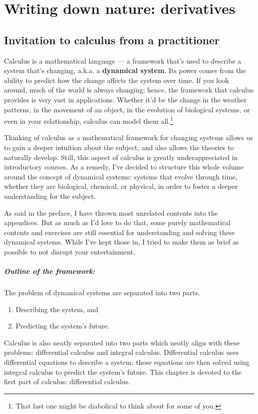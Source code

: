 \chapter{Writing down nature: derivatives}
\label{sec:derivatives}


\section{Invitation to calculus from a practitioner}

Calculus is a mathematical language --- a framework that's used to describe a system that's changing, a.k.a. a \textbf{dynamical system}. Its power comes from the ability to predict how the change affects the system over time. If you look around, much of the world is always changing; hence, the framework that calculus provides is very vast in applications. Whether it'd be the change in the weather patterns, in the movement of an object, in the evolution of biological systems, or even in your relationship, calculus can model them all.\footnote{That last one might be diabolical to think about for some of you.}

Thinking of calculus as a mathematical framework for changing systems allows us to gain a deeper intuition about the subject, and also allows the theories to naturally develop. Still, this aspect of calculus is greatly underappreciated in introductory courses. As a remedy, I've decided to structure this whole volume around the concept of dynamical systems: systems that evolve through time, whether they are biological, chemical, or physical, in order to foster a deeper understanding for the subject.

As said in the preface, I have thrown most unrelated contents into the appendices. But as much as I'd love to do that, some purely mathematical contents and exercises are still essential for understanding and solving these dynamical systems. While I've kept those in, I tried to make them as brief as possible to not disrupt your entertainment.

\paragraph{Outline of the framework:} The problem of dynamical systems are separated into two parts.
\begin{enumerate}[noitemsep]
  \item Describing the system, and
  \item Predicting the system's future.
\end{enumerate}
Calculus is also neatly separated into two parts which neatly align with these problems: differential calculus and integral calculus. Differential calculus uses differential equations to describe a system; those equations are then solved using integral calculus to predict the system's future. This chapter is devoted to the first part of calculus: differential calculus.

